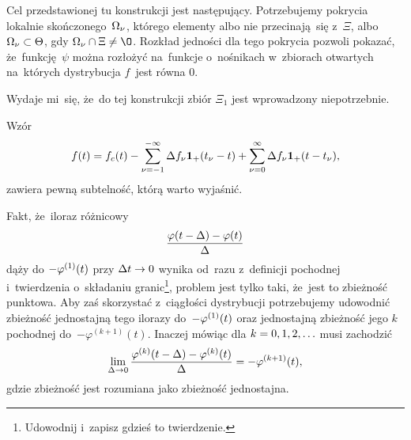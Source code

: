 \documentclass[a4paper,11pt]{article}
\begin{document}
\vspace{\spaceFour}


\start {} Cel przedstawionej tu konstrukcji jest następujący.
Potrzebujemy pokrycia lokalnie skończonego~$\Omega_{ \nu }$, którego
elementy albo nie przecinają~się z~$\Xi$, albo
$\Omega_{ \nu } \subset \Theta$, gdy $\Om_{ \nu } \cap \Xi \neq \O$.
Rozkład jedności dla tego pokrycia pozwoli pokazać, że~funkcję~$\psi$
można rozłożyć na~funkcje o~nośnikach w~zbiorach otwartych na~których
dystrybucja $f$~jest równa $0$.

Wydaje mi~się, że~do tej konstrukcji zbiór $\Xi_{ 1 }$ jest
wprowadzony niepotrzebnie.

\vspace{\spaceFour}


\start {}

\vspace{\spaceFour}


\start {}

\vspace{\spaceFour}


\start {} Wzór
\begin{equation}
  \label{eq:Zem-s01-07}
  f( t ) = f_{ c }( t ) - \sum_{ \nu = -1 }^{ -\infty } \Delta f_{ \nu }
  \mathbf{1}_{ + }( t_{ \nu } - t ) + \sum_{ \nu = 0 }^{ \infty } \Delta f_{ \nu }
  \mathbf{1}_{ + }( t - t_{ \nu } ),
\end{equation}
zawiera pewną subtelność, którą warto wyjaśnić. \Dok

\vspace{\spaceFour}


\start {} Fakt, że~iloraz różnicowy
\begin{equation}
  \label{eq:Zem-s01-08}
  \frac{ \varphi( t - \Delta ) - \varphi( t ) }{ \Delta }
\end{equation}
dąży do $-\varphi^{ ( 1 ) }( t )$ przy $\Delta t \to 0$ wynika od~razu z~definicji
pochodnej i~twierdzenia o~składaniu granic\footnote{Udowodnij i~zapisz
  gdzieś to twierdzenie.}, problem jest tylko taki, że~jest to
zbieżność punktowa. Aby zaś skorzystać z~ciągłości dystrybucji
potrzebujemy udowodnić zbieżność jednostajną tego ilorazy do~$-\varphi^{ ( 1 ) }( t )$
oraz jednostajną zbieżność jego $k$\dywiz pochodnej
do~$-\varphi^{ ( k + 1 ) }( t )$. Inaczej mówiąc dla $k = 0, 1, 2, \ldots$
musi zachodzić
\begin{equation}
  \label{eq:Zem-s01-09}
  \lim\limits_{ \Delta \to 0 } \frac{ \varphi^{ ( k ) }( t - \Delta ) - \varphi^{ ( k ) }( t ) }{ \Delta }
  = -\varphi^{ ( k + 1 ) }( t ),
\end{equation}
gdzie zbieżność jest rozumiana jako zbieżność jednostajna.
\end{document}
